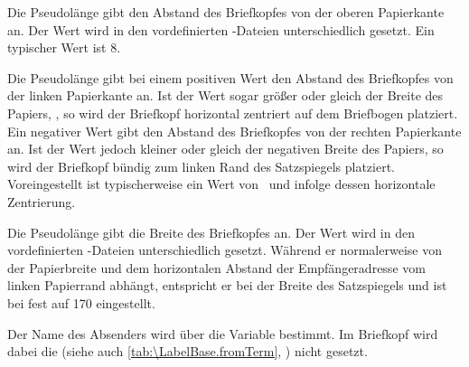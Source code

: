 \begin{Declaration}
\end{Declaration}
Die Pseudolänge  gibt den Abstand des Briefkopfes von
der oberen Papierkante an. Der Wert wird in den vordefinierten
-Dateien
unterschiedlich gesetzt. Ein typischer Wert ist 8.%
\EndIndexGroup


\begin{Declaration}
\end{Declaration}
Die Pseudolänge 
gibt bei einem positiven Wert den Abstand des Briefkopfes von der linken
Papierkante an. Ist der Wert sogar größer oder gleich der
Breite des Papiers,
, so
wird der Briefkopf horizontal zentriert auf dem Briefbogen platziert. Ein
negativer Wert gibt den Abstand des Briefkopfes von der rechten Papierkante
an. Ist der Wert jedoch kleiner oder gleich der negativen Breite des Papiers,
so wird der Briefkopf bündig zum linken Rand des Satzspiegels platziert.
Voreingestellt ist typischerweise ein Wert von
%
%
\ und infolge dessen horizontale Zentrierung.%
\EndIndexGroup


\begin{Declaration}
\end{Declaration}
Die Pseudolänge  gibt die Breite des Briefkopfes
an. Der Wert wird in den vordefinierten
-Dateien
unterschiedlich gesetzt. Während er normalerweise von
der Papierbreite und dem horizontalen Abstand der Empfängeradresse vom linken
Papierrand abhängt, entspricht er bei  der Breite des
Satzspiegels und ist bei  fest auf 170 eingestellt.%
\EndIndexGroup


\begin{Declaration}
\end{Declaration}
Der Name des Absenders wird über die Variable
 bestimmt. Im Briefkopf wird dabei die 
(siehe auch \autoref{tab:\LabelBase.fromTerm},
) nicht gesetzt.

